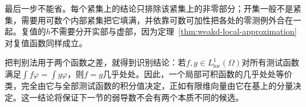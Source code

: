 最后一步不能省。每个紧集上的结论只排除该紧集上的非零部分；开集一般不是紧集，需要用可数个内部紧集把它填满，并依靠可数可加性把各处的零测例外合在一起。复值的$h$不需要分开实部与虚部，因为定理~\ref{thm:weakd-local-approximation}对复值函数同样成立。

把判别法用于两个函数之差，就得到识别结论：若$f,g\in L^1_{\mathrm{loc}}(\Omega)$对所有测试函数满足$\int f\varphi=\int g\varphi$，则$f=g$几乎处处。因此，一个局部可积函数的几乎处处等价类，完全由它与全部测试函数的积分值决定，正如有限维向量由它在基上的分量决定。这一结论将保证下一节的弱导数不会有两个本质不同的候选。
